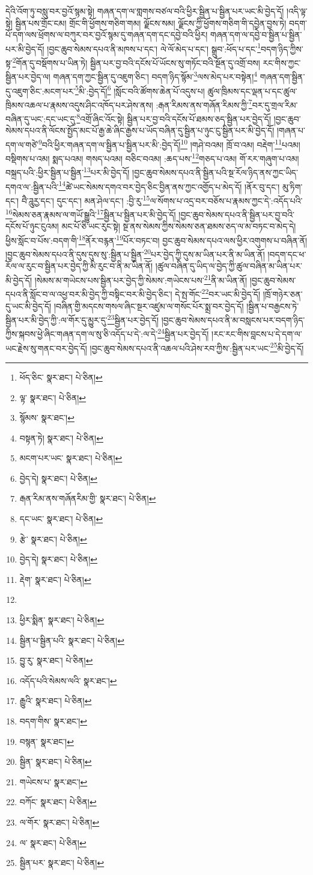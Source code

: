 དེའི་འོག་ཏུ་བསླུ་བར་བྱའོ་སྙམ་སྟེ། གཞན་དག་ལ་གླགས་བཙལ་བའི་ཕྱིར་སྦྱིན་པ་སྦྱིན་པར་ཡང་མི་བྱེད་དོ། །འདི་ལྟ་སྟེ། སྦྱིན་པས་གྲོང་ངམ། གྲོང་གི་ཕྱོགས་གཅིག་གམ། ལྗོངས་སམ། ལྗོངས་ཀྱི་ཕྱོགས་གཅིག་གི་དབྱེན་བྱས་ཏེ། བདག་པོ་དག་ལས་ཕྲོགས་ལ་བཀུར་བར་བྱའོ་སྙམ་དུ་གཞན་དག་དང་དབྱེ་བའི་ཕྱིར། གཞན་དག་ལ་དབྱེ་བ་སྦྱིན་པ་སྦྱིན་པར་མི་བྱེད་དོ། །བྱང་ཆུབ་སེམས་དཔའ་ནི་མཁས་པ་དང་། ལེ་ལོ་མེད་པ་དང་། སྒྲུབ་:ཕོད་པ་དང་\footnote{ཕོད་ཅིང་  སྣར་ཐང་།  པེ་ཅིན། }བདག་ཉིད་ཀྱིས་སྟ་\footnote{ལྟ་  སྣར་ཐང་།  པེ་ཅིན། }གོན་དུ་བསྡོགས་པ་ཡིན་ཏེ། སྦྱིན་པར་བྱ་བའི་དངོས་པོ་ཡོངས་སུ་གཏོང་བའི་སྔོན་དུ་འགྲོ་བས། རང་གིས་ཀྱང་སྦྱིན་པར་བྱེད་ལ། གཞན་དག་ཀྱང་སྦྱིན་དུ་འཇུག་ཅིང་། བདག་ཉིད་སྙོམ་\footnote{སྙོམས་  སྣར་ཐང་། }ལས་མེད་པར་བསྟེན།\footnote{བསྟན་ཏེ།  སྣར་ཐང་།  པེ་ཅིན། } གཞན་དག་སྦྱིན་དུ་འཇུག་ཅིང་:མངག་པར་\footnote{མངག་པར་ཡང་  སྣར་ཐང་།  པེ་ཅིན། }མི་:བྱེད་དོ།\footnote{བྱེད་དེ།  སྣར་ཐང་།  པེ་ཅིན། } །སློང་བའི་ཚོགས་ཆེན་པོ་འདུས་པ། ཚུལ་ཁྲིམས་དང་ལྡན་པ་དང་ཚུལ་ཁྲིམས་འཆལ་པ་རྣམས་འདུས་ཤིང་འཁོད་པར་ཤེས་ནས། :རྒན་རིམས་ནས་གཞོན་རིམས་ཀྱི་\footnote{རྒན་རིམ་ནས་གཞོནརིམ་གྱི་  སྣར་ཐང་།  པེ་ཅིན། }བར་དུ་གྲལ་རིམ་བཞིན་དུ་ཡང་:དང་ཡང་དུ་\footnote{དང་ཡང་  སྣར་ཐང་།  པེ་ཅིན། }འགྲོ་ཞིང་འོང་སྟེ། སྦྱིན་པར་བྱ་བའི་དངོས་པོ་ཐམས་ཅད་སྦྱིན་པར་བྱེད་དོ། །བྱང་ཆུབ་སེམས་དཔའ་ནི་ལོངས་སྤྱོད་མང་པོ་རྒྱ་ཆེ་ཞིང་རྒྱས་པ་ཡོད་བཞིན་དུ་སྦྱིན་པ་ཉུང་ངུ་སྦྱིན་པར་མི་བྱེད་དོ། །གཞན་པ་དག་ལ་གཙེ་\footnote{རྩེ་  སྣར་ཐང་།  པེ་ཅིན། }བའི་ཕྱིར་གཞན་དག་ལ་སྦྱིན་པ་སྦྱིན་པར་མི་:བྱེད་དོ།\footnote{བྱེད་དེ།  སྣར་ཐང་།  པེ་ཅིན། } །གཤེ་བའམ། ཁྲོ་བ་འམ། བརྡེག་\footnote{རྡེག་  སྣར་ཐང་།  པེ་ཅིན། }པའམ། བསྡིགས་པ་འམ། སྨད་པའམ། གསད་པའམ། བཅིང་བའམ། :ཆད་པས་\footnote{}གཅད་པ་འམ། གོ་རར་གཞུག་པ་འམ། བསྐྲད་པའི་:ཕྱིར་སྦྱིན་པ་སྦྱིན་\footnote{ཕྱིར་སྨིན་  སྣར་ཐང་།  པེ་ཅིན། }པར་མི་བྱེད་དོ། །བྱང་ཆུབ་སེམས་དཔའ་ནི་སྦྱིན་པའི་སྔ་རོལ་ཉིད་ནས་ཀྱང་ཡིད་དགའ་ལ་:སྦྱིན་པའི་\footnote{སྦྱིན་པ་སྦྱིན་པའི་  སྣར་ཐང་།  པེ་ཅིན། }ཚེ་ཡང་སེམས་དགའ་བར་བྱེད་ཅིང་བྱིན་ནས་ཀྱང་འགྱོད་པ་མེད་དོ། །ནོར་བུ་དང་། མུ་ཏིག་དང་། བཻ་ཌཱུརྱ་དང་། དུང་དང་། མན་ཤེལ་དང་། :བྱི་རུ་\footnote{བྱུ་རུ་  སྣར་ཐང་།  པེ་ཅིན། }ལ་སོགས་པ་འདྲ་བར་བཅོས་པ་རྣམས་ཀྱང་དེ་:འདོད་པའི་\footnote{འདོད་པའི་སེམས་ལའི་  སྣར་ཐང་། }སེམས་ཅན་རྣམས་ལ་གཡོ་སྒྱུའི་\footnote{རྒྱུའི་  སྣར་ཐང་།  པེ་ཅིན། }སྦྱིན་པ་སྦྱིན་པར་མི་བྱེད་དོ། །བྱང་ཆུབ་སེམས་དཔའ་ནི་སྦྱིན་པར་བྱ་བའི་དངོས་པོ་ཉུང་ངུའམ། མང་པོ་ཅི་ཡང་རུང་སྟེ། སྔ་ནས་སེམས་ཀྱིས་སེམས་ཅན་ཐམས་ཅད་ལ་མ་བཏང་བ་མེད་དེ། ཕྱིས་སློང་བ་པོས་:བདག་གི་\footnote{བདག་གིས་  སྣར་ཐང་། }ནོར་བརྙན་\footnote{བསྙན་  སྣར་ཐང་། }པོར་བཏང་བ། བྱང་ཆུབ་སེམས་དཔའ་ལས་ཕྱིར་འགུགས་པ་བཞིན་ནོ། །བྱང་ཆུབ་སེམས་དཔའ་ནི་དུས་དུས་སུ་:སྦྱིན་པ་སྦྱིན་\footnote{སྦྱིན་  སྣར་ཐང་།  པེ་ཅིན། }པར་བྱེད་ཀྱི་དུས་མ་ཡིན་པར་ནི་མ་ཡིན་ནོ། །བདག་དང་ཕ་རོལ་ལ་རུང་བ་སྦྱིན་པར་བྱེད་ཀྱི་མི་རུང་བ་ནི་མ་ཡིན་ནོ། །ཚུལ་བཞིན་དུ་ཡིད་ལ་བྱེད་ཀྱི་ཚུལ་བཞིན་མ་ཡིན་པར་མི་བྱེད་དོ། །སེམས་མ་གཡེངས་པས་སྦྱིན་པར་བྱེད་ཀྱི་སེམས་:གཡེངས་པས་\footnote{གཡེངས་པ་  སྣར་ཐང་། }ནི་མ་ཡིན་ནོ། །བྱང་ཆུབ་སེམས་དཔའ་ནི་སློང་བ་ལ་འཕྱ་བར་མི་བྱེད་ཀྱི་བསྟིང་བར་མི་བྱེད་ཅིང་། དེ་སྤ་གོང་\footnote{བཀོང་  སྣར་ཐང་།  པེ་ཅིན། }བར་ཡང་མི་བྱེད་དོ། །ཁྲོ་གཉེར་ཅན་དུ་ཡང་མི་བྱེད་དོ། །བཞིན་གྱི་མདངས་གསལ་ཞིང་སྔར་འཛུམ་ལ་གསོང་པོར་སྨྲ་བར་བྱེད་དོ། །སྦྱིན་པ་བརྒྱངས་ཏེ་སྦྱིན་པར་མི་བྱེད་ཀྱི་:ལ་གོར་དུ་མྱུར་དུ་\footnote{ལ་གོར་  སྣར་ཐང་།  པེ་ཅིན། }སྦྱིན་པར་བྱེད་དོ། །བྱང་ཆུབ་སེམས་དཔའ་ནི་མ་བསླངས་པར་བདག་ཉིད་ཀྱིས་སྐབས་ཕྱེ་ཞིང་གཞན་དག་ལ་སུ་ཅི་འདོད་པ་དེ་:ལ་དེ་\footnote{ལ་  སྣར་ཐང་།  པེ་ཅིན། }སྦྱིན་པར་བྱེད་དོ། །རང་རང་གིས་བླངས་པ་དེ་དག་ལ་ཡང་རྗེས་སུ་གནང་བར་བྱེད་དོ། །བྱང་ཆུབ་སེམས་དཔའ་ནི་འཆལ་པའི་ཤེས་རབ་ཀྱིས་:སྦྱིན་པར་ཡང་\footnote{སྦྱིན་པར་  སྣར་ཐང་།  པེ་ཅིན། }མི་བྱེད་དོ། 